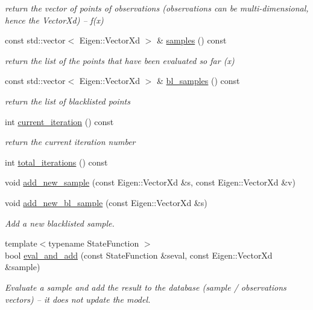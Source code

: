 \begin{DoxyCompactItemize}
\begin{DoxyCompactList}\small\item\em return the vector of points of observations (observations can be multi-\/dimensional, hence the Vector\+Xd) -- f(x) \end{DoxyCompactList}\item 
const std\+::vector$<$ Eigen\+::\+Vector\+Xd $>$ \& \hyperlink{classlimbo_1_1bayes__opt_1_1_bo_base_a3a68d0a9fce39ae5575c63a57a549f58}{samples} () const 
\begin{DoxyCompactList}\small\item\em return the list of the points that have been evaluated so far (x) \end{DoxyCompactList}\item 
const std\+::vector$<$ Eigen\+::\+Vector\+Xd $>$ \& \hyperlink{classlimbo_1_1bayes__opt_1_1_bo_base_aa85b7824943ae2ee35b50b446f6740c6}{bl\+\_\+samples} () const 
\begin{DoxyCompactList}\small\item\em return the list of blacklisted points \end{DoxyCompactList}\item 
int \hyperlink{classlimbo_1_1bayes__opt_1_1_bo_base_abbd79a26fafeb6ea8f09df782972caa0}{current\+\_\+iteration} () const 
\begin{DoxyCompactList}\small\item\em return the current iteration number \end{DoxyCompactList}\item 
int \hyperlink{classlimbo_1_1bayes__opt_1_1_bo_base_a923fec38c8f1c473fdd9cf35b395b471}{total\+\_\+iterations} () const 
\item 
void \hyperlink{classlimbo_1_1bayes__opt_1_1_bo_base_a77482415d06619f49e6b0300fc950f96}{add\+\_\+new\+\_\+sample} (const Eigen\+::\+Vector\+Xd \&s, const Eigen\+::\+Vector\+Xd \&v)
\item 
void \hyperlink{classlimbo_1_1bayes__opt_1_1_bo_base_a7197b0c20d5644ec44070432555eb49b}{add\+\_\+new\+\_\+bl\+\_\+sample} (const Eigen\+::\+Vector\+Xd \&s)
\begin{DoxyCompactList}\small\item\em Add a new blacklisted sample. \end{DoxyCompactList}\item 
{\footnotesize template$<$typename State\+Function $>$ }\\bool \hyperlink{classlimbo_1_1bayes__opt_1_1_bo_base_a49f332ebc6e526169c619e6bc4430116}{eval\+\_\+and\+\_\+add} (const State\+Function \&seval, const Eigen\+::\+Vector\+Xd \&sample)
\begin{DoxyCompactList}\small\item\em Evaluate a sample and add the result to the \textquotesingle{}database\textquotesingle{} (sample / observations vectors) -- it does not update the model. \end{DoxyCompactList}\end{DoxyCompactItemize}


